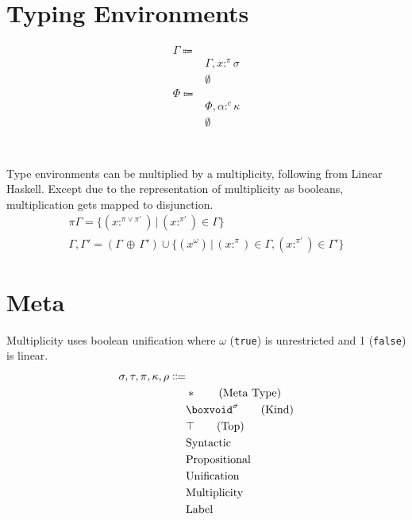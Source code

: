 \documentclass {article}
\begin{document}
\section{Typing Environments}
\begin{align*}
\Gamma \Coloneqq & \\
& \Gamma, x :^\pi \sigma \\
& \emptyset \\
\Phi \Coloneqq & \\
& \Phi, \alpha :^c \kappa \\
& \emptyset \\
\end{align*} \\
\\
Type environments can be multiplied by a multiplicity, following from Linear Haskell.
Except due to the representation of multiplicity as booleans, multiplication gets mapped to disjunction.
\begin{gather*}
\pi \Gamma = \{(x :^{\pi \lor  \pi'}) \, | \, (x :^{\pi'}) \in \Gamma \} \\
\Gamma, \Gamma' = (\Gamma \, \oplus \, \Gamma') \cup \{ (x^\omega) \, | \, (x :^\pi) \in \Gamma, (x :^{\pi'}) \in \Gamma' \}
\end{gather*}

\section{Meta}
Multiplicity uses boolean unification where $ \omega $ (\texttt{true}) is unrestricted and 1 (\texttt{false}) is linear.
\begin{align*}
\sigma, \tau, \pi, \kappa, \rho \Coloneqq & \\
& * \tag{Meta Type} \\
& \boxvoid^\sigma \tag{Kind} \\
& \top \tag{Top} \\
& \text{Syntactic} \\
& \text{Propositional} \\
& \text{Unification} \\
& \text{Multiplicity} \\
& \text{Label}
\end{align*}
\end{document}
